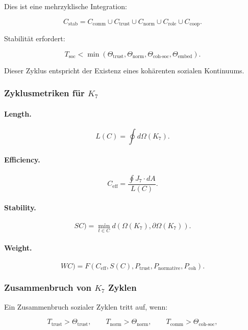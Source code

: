 Dies ist eine mehrzyklische Integration:

\[
  C_{\mathrm{stab}}
    =
    C_{\mathrm{comm}}
    \cup
    C_{\mathrm{trust}}
    \cup
    C_{\mathrm{norm}}
    \cup
    C_{\mathrm{role}}
    \cup
    C_{\mathrm{coop}}.
\]

Stabilität erfordert:

\[
  T_{\mathrm{soc}}
  <
  \min(\Theta_{\mathrm{trust}},
       \Theta_{\mathrm{norm}},
       \Theta_{\mathrm{coh\text{-}soc}},
       \Theta_{\mathrm{embed}}).
\]

Dieser Zyklus entspricht der Existenz eines kohärenten sozialen Kontinuums.

\subsubsection{Zyklusmetriken für \texorpdfstring{$K_7$}{K_7}}

\paragraph{Length.}
\[
L(C)
  = \oint d\Omega(K_7).
\]

\paragraph{Efficiency.}
\[
  C_{\mathrm{eff}}
    =
    \frac{\oint J_7\cdot dA}{L(C)}.
\]

\paragraph{Stability.}
\[
SC)
  = \min_{t\in C}
    d(\Omega(K_7), \partial\Omega(K_7)).
\]

\paragraph{Weight.}
\[
WC)
 =
 F(C_{\mathrm{eff}},S(C),
   P_{\mathrm{trust}},
   P_{\mathrm{normative}},
   P_{\mathrm{coh}}).
\]

\subsubsection{Zusammenbruch von \texorpdfstring{$K_7$}{K_7} Zyklen}

Ein Zusammenbruch sozialer Zyklen tritt auf, wenn:

\[
 T_{\mathrm{trust}} > \Theta_{\mathrm{trust}},
 \qquad
 T_{\mathrm{norm}} > \Theta_{\mathrm{norm}},
 \qquad
 T_{\mathrm{comm}} > \Theta_{\mathrm{coh\text{-}soc}},
\]

